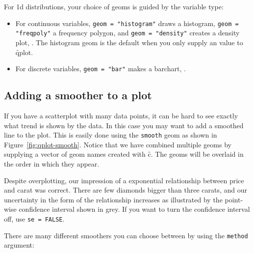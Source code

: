 For 1d distributions, your choice of geoms is guided by the variable type:

\begin{itemize}
  \item For continuous variables, {\tt geom = "histogram"} draws a histogram, {\tt geom = "freqpoly"} a frequency polygon, and {\tt geom = "density"} creates a density plot, .  The histogram geom is the default when you only supply an  value to \f{qplot}.

  \item For discrete variables, {\tt geom = "bar"} makes a barchart, .

\end{itemize}


\subsection{Adding a smoother to a plot}\label{sub:smooth}

If you have a scatterplot with many data points, it can be hard to see exactly what trend is shown by the data. In this case you may want to add a smoothed line to the plot. This is easily done using the {\tt smooth} geom as shown in Figure~\ref{fig:qplot-smooth}. Notice that we have combined multiple geoms by supplying a vector of geom names created with \f{c}.  The geoms will be overlaid in the order in which they appear.  

% 


Despite overplotting, our impression of a exponential relationship between price and carat was correct. There are few diamonds bigger than three carats, and our uncertainty in the form of the relationship increases as illustrated by the point-wise confidence interval shown in grey. If you want to turn the confidence interval off, use {\tt se = FALSE}. 

There are many different smoothers you can choose between by using the {\tt method} argument:


